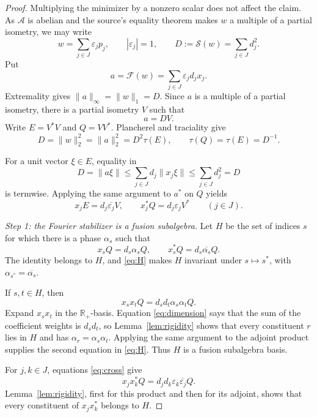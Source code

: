 \documentclass[11pt]{amsart}
\newcommand{\A}{\mathcal A}
\newcommand{\F}{\mathcal F}
\begin{document}
\begin{proof}
Multiplying the minimizer by a nonzero scalar does not affect the claim.  As
$\A$ is abelian and the source's equality theorem makes $w$ a multiple of a
partial isometry, we may write
\begin{equation}\label{eq:w}
 w=\sum_{j\in J}\varepsilon_jp_j,
 \qquad |\varepsilon_j|=1,
 \qquad D:=\mathcal S(w)=\sum_{j\in J}d_j^2.
\end{equation}
Put
\[
 a=\F(w)=\sum_{j\in J}\varepsilon_jd_jx_j.
\]
Extremality gives $\|a\|_\infty=\|w\|_1=D$.  Since $a$ is a multiple of a
partial isometry, there is a partial isometry $V$ such that
\begin{equation}\label{eq:aDV}
 a=DV.
\end{equation}
Write $E=V^*V$ and $Q=VV^*$.  Plancherel and traciality give
\begin{equation}\label{eq:traces}
 D=\|w\|_2^2=\|a\|_2^2=D^2\tau(E),
 \qquad \tau(Q)=\tau(E)=D^{-1}.
\end{equation}

For a unit vector $\xi\in E$, equality in
\[
 D=\|a\xi\|
 \leq\sum_{j\in J}d_j\|x_j\xi\|
 \leq\sum_{j\in J}d_j^2=D
\]
is termwise.  Applying the same argument to $a^*$ on $Q$ yields
\begin{equation}\label{eq:cross}
 x_jE=d_j\overline{\varepsilon_j}V,
 \qquad
 x_j^*Q=d_j\varepsilon_jV^*
 \qquad(j\in J).
\end{equation}

\medskip\noindent
\emph{Step 1: the Fourier stabilizer is a fusion subalgebra.}
Let $H$ be the set of indices $s$ for which there is a phase $\alpha_s$ such
that
\begin{equation}\label{eq:H}
 x_sQ=d_s\alpha_sQ,
 \qquad
 x_s^*Q=d_s\overline{\alpha_s}Q.
\end{equation}
The identity belongs to $H$, and \eqref{eq:H} makes $H$ invariant under
$s\mapsto s^*$, with $\alpha_{s^*}=\overline{\alpha_s}$.

If $s,t\in H$, then
\[
 x_sx_tQ=d_sd_t\alpha_s\alpha_tQ.
\]
Expand $x_sx_t$ in the $\mathbb R_+$-basis.  Equation
\eqref{eq:dimension} says that the sum of the coefficient weights is
$d_sd_t$, so Lemma~\ref{lem:rigidity} shows that every constituent $r$ lies
in $H$ and has $\alpha_r=\alpha_s\alpha_t$.  Applying the same argument to
the adjoint product supplies the second equation in \eqref{eq:H}.  Thus $H$
is a fusion subalgebra basis.

For $j,k\in J$, equations \eqref{eq:cross} give
\begin{equation}\label{eq:difference}
 x_jx_k^*Q=d_jd_k\varepsilon_k\overline{\varepsilon_j}Q.
\end{equation}
Lemma~\ref{lem:rigidity}, first for this product and then for its adjoint,
shows that every constituent of $x_jx_k^*$ belongs to $H$.


\end{proof}
\end{document}
